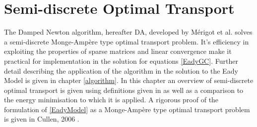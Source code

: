 \chapter{Semi-discrete Optimal Transport}
The Damped Newton algorithm, hereafter DA, developed by M\'{e}rigot et al. \cite{Merigot2017} solves a semi-discrete Monge-Amp\`{e}re type optimal transport problem. It's efficiency in exploiting the properties of sparse matrices and linear convergence \cite{Merigot2017} make it practical for implementation in the solution for equations \ref{EadyGC}. Further detail describing the application of the algorithm in the solution to the Eady Model is given in chapter \ref{algorithm}. In this chapter an overview of semi-discrete optimal transport is given using definitions given in \cite{Kitagawa2016, Merigot2017} as well as a comparison to the energy minimisation to which it is applied. A rigorous proof of the formulation of \ref{EadyModel} as a Monge-Amp\`{e}re type optimal transport problem is given in Cullen, 2006 \cite{Cullen2006a}.

